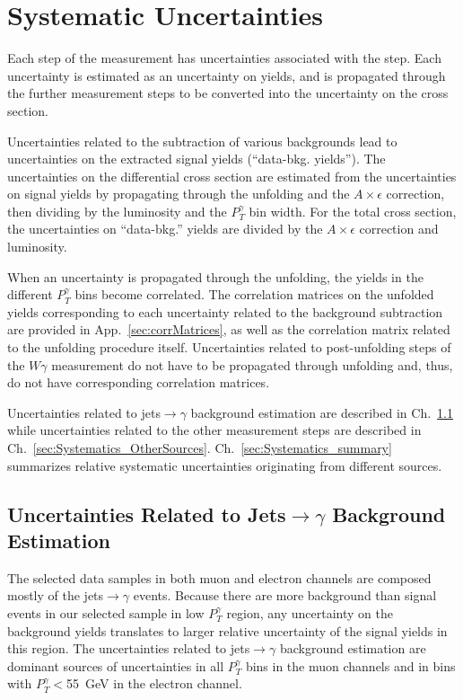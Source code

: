 \section{Systematic Uncertainties}
\label{sec:Systematics}

Each step of the measurement has uncertainties associated with the step. Each uncertainty is estimated as an uncertainty on yields, and is propagated through the further measurement steps to be converted into the uncertainty on the cross section. 

Uncertainties related to the subtraction of various backgrounds lead to uncertainties on the extracted signal yields (``data-bkg. yields''). The uncertainties on the differential cross section are estimated from the uncertainties on signal yields by propagating through the unfolding and the $A \times \epsilon$ correction, then dividing by the luminosity and the $P_T^{\gamma}$ bin width. For the total cross section, the uncertainties on ``data-bkg.'' yields are divided by the $A \times \epsilon$ correction and luminosity. 

When an uncertainty is propagated through the unfolding, the yields in the different $P_T^{\gamma}$ bins become correlated. The correlation matrices on the unfolded yields corresponding to each uncertainty related to the background subtraction are provided in App.~\ref{sec:corrMatrices}, as well as the correlation matrix related to the unfolding procedure itself. Uncertainties related to post-unfolding steps of the $W\gamma$ measurement do not have to be propagated through unfolding and, thus, do not have corresponding correlation matrices. 

Uncertainties related to jets$\rightarrow\gamma$ background estimation are described in Ch.~\ref{sec:Systematics_jtog} while uncertainties related to the other measurement steps are described in Ch.~\ref{sec:Systematics_OtherSources}. Ch.~\ref{sec:Systematics_summary} summarizes relative systematic uncertainties originating from different sources.

\subsection{Uncertainties Related to Jets$\rightarrow\gamma$ Background Estimation}
\label{sec:Systematics_jtog}

The selected data samples in both muon and electron channels are composed mostly of the jets$\rightarrow\gamma$ events. Because there are more background than signal events in our selected sample in low $P_T^{\gamma}$ region, any uncertainty on the background yields translates to larger relative uncertainty of the signal yields in this region. The uncertainties related to jets$\rightarrow\gamma$ background estimation are dominant sources of uncertainties in all $P_T^{\gamma}$ bins in the muon channels and in bins with $P_T^{\gamma}<$55~GeV in the electron channel.

